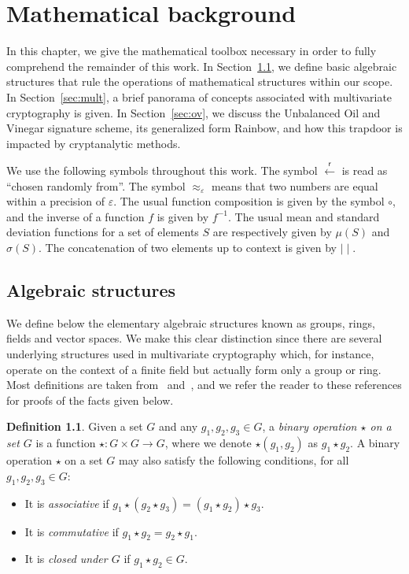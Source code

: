 \documentclass[12pt, a4paper, oneside]{memoir}
\newcommand{\random}{\overset{\mathsf{r}}{\gets}}
\theoremstyle{definition}
\newtheorem{definition}[theorem]{Definition}
\begin{document}

\chapter{Mathematical background}\label{chapter:math}

In this chapter, we give the mathematical toolbox necessary in order to fully comprehend the remainder of this work. In Section~\ref{sec:algebra}, we define basic algebraic structures that rule the operations of mathematical structures within our scope. In Section~\ref{sec:mult}, a brief panorama of concepts associated with multivariate cryptography is given. In Section~\ref{sec:ov}, we discuss the Unbalanced Oil and Vinegar signature scheme, its generalized form Rainbow, and how this trapdoor is impacted by cryptanalytic methods.

We use the following symbols throughout this work. The symbol $\random$ is read as ``chosen randomly from''. The symbol $\approx_{\varepsilon}$ means that two numbers are equal within a precision of $\varepsilon$. The usual function composition is given by the symbol $\circ$, and the inverse of a function $f$ is given by $f^{-1}$. The usual mean and standard deviation functions for a set of elements $S$ are respectively given by $\mu(S)$ and $\sigma(S)$. The concatenation of two elements up to context is given by $\mid\mid$.

\section{Algebraic structures}\label{sec:algebra}

We define below the elementary algebraic structures known as groups, rings, fields and vector spaces. We make this clear distinction since there are several underlying structures used in multivariate cryptography which, for instance, operate on the context of a finite field but actually form only a group or ring. Most definitions are taken from~\cite{Dummit:2003} and~\cite{Mullen:2013}, and we refer the reader to these references for proofs of the facts given below.

\begin{definition}
  Given a set $G$ and any $g_{1}, g_{2}, g_{3} \in G$, a \emph{binary operation $\star$ on a set $G$} is a function $\star : G \times G \to G$, where we denote $\star(g_{1}, g_{2})$ as $g_{1} \star g_{2}$. A binary operation $\star$ on a set $G$ may also satisfy the following conditions, for all $g_{1}, g_{2}, g_{3} \in G$:
  
  \begin{itemize}
    \item It is \emph{associative} if $g_{1} \star (g_{2} \star g_{3}) = (g_{1} \star g_{2}) \star g_{3}$.
    \item It is \emph{commutative} if $g_{1} \star g_{2} = g_{2} \star g_{1}$.
    \item It is \emph{closed under $G$} if $g_{1} \star g_{2} \in G$.
  \end{itemize}
\end{definition}
\end{document}
